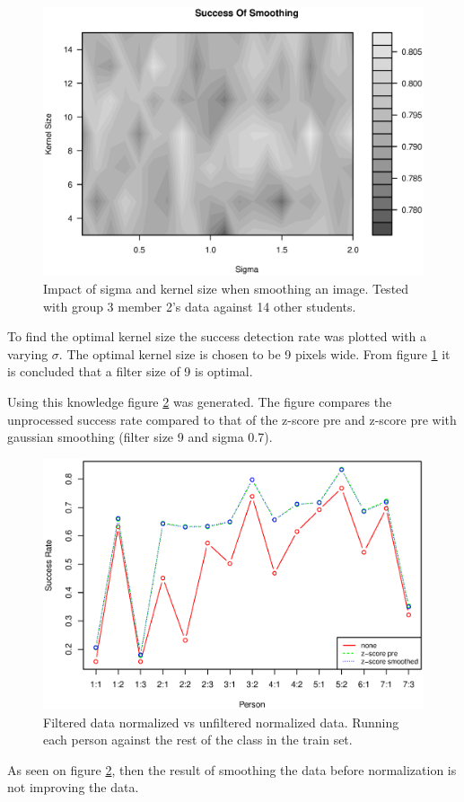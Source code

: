 \begin{figure}[H]
\centering
\includegraphics[width = \textwidth]{graphics/success_of_smoothing_contour}
\caption[Optimal smoothing]{Impact of sigma and kernel size when smoothing an image. 
Tested with group 3 member 2's data against 14 other students.
}
\label{fig:smoothing_contour}
\end{figure}

To find the optimal kernel size the success detection rate was plotted with a varying $\sigma$. 
The optimal kernel size is chosen to be 9 pixels wide.
From figure \ref{fig:smoothing_contour} it is concluded that a filter size of 9 is optimal.

Using this knowledge figure \ref{fig:normalization_test_with_smooth} was generated.
The figure compares the unprocessed success rate compared to that of the z-score pre and z-score pre with gaussian smoothing (filter size 9 and sigma 0.7).


 \begin{figure}[H]
 \centering
 \includegraphics[width = \textwidth]{graphics/graph_normalization_smoothed}
 \caption[Filtered and normalized data.]{Filtered data normalized vs unfiltered normalized data.
 Running each person against the rest of the class in the train set.
 }
 \label{fig:normalization_test_with_smooth}
 \end{figure}

As seen on figure \ref{fig:normalization_test_with_smooth}, then the result of smoothing the data before normalization is not improving the data.
